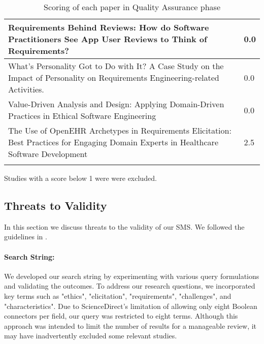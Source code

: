 \begin{longtable}{| m{10cm} | m{2cm} |}
    \hline
    Requirements Behind Reviews: How do Software Practitioners See App User Reviews to Think of Requirements? & 0.0 \\
    \hline
    What's Personality Got to Do with It? A Case Study on the Impact of Personality on Requirements Engineering-related Activities. & 0.0 \\
    \hline
    Value-Driven Analysis and Design: Applying Domain-Driven Practices in Ethical Software Engineering & 0.0 \\
    \hline
    The Use of OpenEHR Archetypes in Requirements Elicitation: Best Practices for Engaging Domain Experts in Healthcare Software Development & 2.5 \\
    \hline
    \caption{Scoring of each paper in Quality Assurance phase}
    \label{tab:qa_scoring}
\end{longtable}

Studies with a score below 1 were were excluded.

\subsection{Threats to Validity}
In this section we discuss threats to the validity of our SMS. We followed the guidelines in \cite{montgomery2022empirical}.





\paragraph{\textbf{Search String:}}
We developed our search string by experimenting with various query formulations and validating the outcomes. To address our research questions, we incorporated key terms such as "ethics", 
"elicitation", "requirements", "challenges", and "characteristics". Due to ScienceDirect's limitation of allowing only eight Boolean connectors per field, our query was restricted to eight terms. 
Although this approach was intended to limit the number of results for a manageable review, it may have inadvertently excluded some relevant studies.


